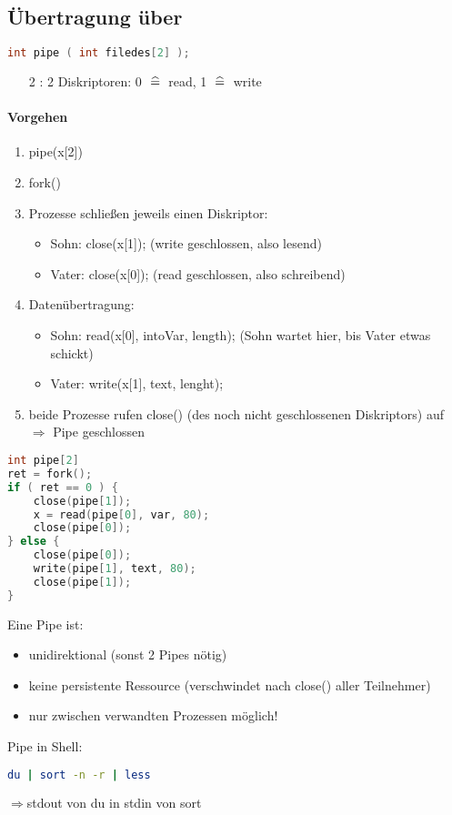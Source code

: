 \subsection[Übertragung über Pipe]{Übertragung über }
\begin{lstlisting}[language=C]
int pipe ( int filedes[2] );
\end{lstlisting}
\begin{itemize}
\item [2]: 2 Diskriptoren: 0 $\;\widehat{=}\;$ read, 1 $\;\widehat{=}\;$ write
\end{itemize}
\paragraph{Vorgehen}
\begin{enumerate}
\item pipe(x[2])
\item fork()
\item Prozesse schließen jeweils einen Diskriptor:
\begin{itemize}
\item Sohn: close(x[1]); (write geschlossen, also lesend)
\item Vater: close(x[0]); (read geschlossen, also schreibend)
\end{itemize}
\item Datenübertragung:
\begin{itemize}
\item Sohn: read(x[0], intoVar, length); (Sohn wartet hier, bis Vater etwas schickt)
\item Vater: write(x[1], text, lenght);
\end{itemize}
\item beide Prozesse rufen close() (des noch nicht geschlossenen Diskriptors) auf $\Rightarrow$ Pipe geschlossen
\end{enumerate}
\begin{lstlisting}[language=C]
int pipe[2]
ret = fork();
if ( ret == 0 ) {
	close(pipe[1]);
	x = read(pipe[0], var, 80);
	close(pipe[0]);
} else {
	close(pipe[0]);
	write(pipe[1], text, 80);
	close(pipe[1]);
}
\end{lstlisting}
Eine Pipe ist:
\begin{itemize}
\item unidirektional (sonst 2 Pipes nötig)
\item keine persistente Ressource (verschwindet nach close() aller Teilnehmer)
\item nur zwischen verwandten Prozessen möglich!
\end{itemize}
Pipe in Shell:
\begin{lstlisting}[language=bash]
du | sort -n -r | less
\end{lstlisting}
$\Rightarrow$stdout von du in stdin von sort

